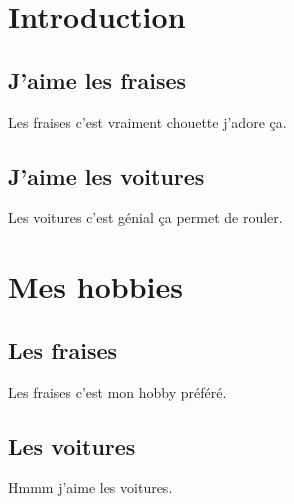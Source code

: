 \documentclass{article}
\begin{document}
\maketitle

\section{Introduction}
\subsection{J'aime les fraises}
Les fraises c'est vraiment chouette j'adore ça.

\subsection{J'aime les voitures}
Les voitures c'est génial ça permet de rouler.

\section{Mes hobbies}
\subsection{Les fraises}
Les fraises c'est mon hobby préféré.
\subsection{Les voitures}
Hmmm j'aime les voitures.
\end{document}
